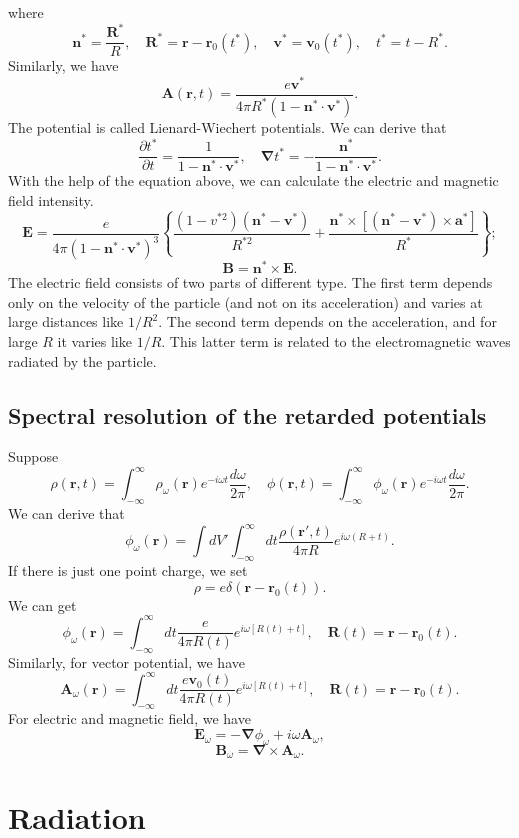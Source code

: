 where 
\[\bm{n}^* = \frac{\bm{R}^*}{R}, \quad \bm{R}^* = \bm{r} - \bm{r}_0(t^*) , \quad \bm{v}^* = \bm{v}_0(t^*) , \quad t^* = t - R^*.\]
Similarly, we have
\[\bm{A}(\bm{r},t) = \frac{e\bm{v}^*}{4\pi R^* (1 - \bm{n}^{*}\cdot\bm{v}^{*})}.\]
The potential is called Lienard-Wiechert potentials.
We can derive that
\[\frac{\partial t^*}{\partial t} = \frac{1}{1- \bm{n}^{*}\cdot\bm{v}^{*}}, \quad \bm{\nabla} t^* = -\frac{\bm{n}^*}{1 - \bm{n}^* \cdot \bm{v}^*}.\]
With the help of the equation above, we can calculate the electric and magnetic field intensity.
\[\bm{E} = \frac{e}{4\pi(1 - \bm{n}^* \cdot \bm{v}^*)^3} \left\{ \frac{(1-v^{*2})(\bm{n}^* - \bm{v}^*)}{R^{*2}} + \frac{\bm{n}^* \times \left[(\bm{n}^* - \bm{v}^*) \times \bm{a}^*\right]}{R^*} \right\};\]
\[\bm{B} = \bm{n}^* \times \bm{E}.\]
The electric field consists of two parts of different type. The first term depends only on the velocity of the particle (and not on its acceleration) and varies at large distances like ${1}/{R^2}$. The second term depends on the acceleration, and for large $R$ it varies like ${1}/{R}$. This latter term is related to the electromagnetic waves radiated by the particle.

\subsection{Spectral resolution of the retarded potentials}
Suppose
\[\rho(\bm{r},t) = \int_{-\infty}^{\infty} \rho_{\omega}(\bm{r}) e^{-i\omega t} \frac{d\omega}{2\pi} , \quad \phi(\bm{r},t) = \int_{-\infty}^{\infty} \phi_{\omega}(\bm{r}) e^{-i\omega t} \frac{d\omega}{2\pi}.\]
We can derive that
\[\phi_{\omega}(\bm{r}) = \int dV' \int_{-\infty}^{\infty} dt \frac{\rho(\bm{r}',t)}{4\pi R} e^{i\omega(
R+t)}.\]
If there is just one point charge, we set
\[\rho = e\delta(\bm{r} - \bm{r}_0(t)).\]
We can get
\[\phi_{\omega}(\bm{r}) =  \int_{-\infty}^{\infty} dt \frac{e}{4\pi R(t)} e^{i\omega[
R(t)+t]} , \quad \bm{R}(t) =\bm{r}-\bm{r}_0(t).\]
Similarly, for vector potential, we have
\[\bm{A}_{\omega}(\bm{r}) =  \int_{-\infty}^{\infty} dt \frac{e\bm{v}_0(t)}{4\pi R(t)} e^{i\omega[
R(t)+t]} , \quad \bm{R}(t) =\bm{r}-\bm{r}_0(t).\]
For electric and magnetic field, we have
\[\bm{E}_{\omega} = -\bm{\nabla}\phi_{\omega} + i\omega \bm{A}_{\omega},\]
\[\bm{B}_{\omega} = \bm{\nabla} \times \bm{A}_{\omega}.\]

\section{Radiation}
